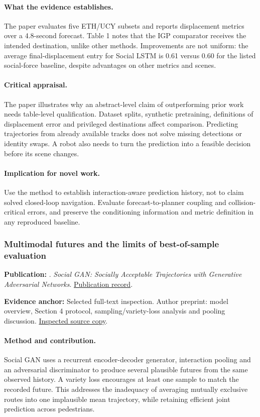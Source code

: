 \paragraph{What the evidence establishes.} The paper evaluates five ETH/UCY subsets and reports displacement metrics over a 4.8-second forecast. Table 1 notes that the IGP comparator receives the intended destination, unlike other methods. Improvements are not uniform: the average final-displacement entry for Social LSTM is 0.61 versus 0.60 for the listed social-force baseline, despite advantages on other metrics and scenes.

\paragraph{Critical appraisal.} The paper illustrates why an abstract-level claim of outperforming prior work needs table-level qualification. Dataset splits, synthetic pretraining, definitions of displacement error and privileged destinations affect comparison. Predicting trajectories from already available tracks does not solve missing detections or identity swaps. A robot also needs to turn the prediction into a feasible decision before its scene changes.

\paragraph{Implication for novel work.} Use the method to establish interaction-aware prediction history, not to claim solved closed-loop navigation. Evaluate forecast-to-planner coupling and collision-critical errors, and preserve the conditioning information and metric definition in any reproduced baseline.

\subsubsection{Multimodal futures and the limits of best-of-sample evaluation}\label{paper:socialgan}
\textbf{Publication:} \citet{socialgan}. \emph{Social GAN: Socially Acceptable Trajectories with Generative Adversarial Networks}. \href{https://doi.org/10.1109/cvpr.2018.00240}{Publication record}.

\textbf{Evidence anchor:} Selected full-text inspection. Author preprint: model overview, Section 4 protocol, sampling/variety-loss analysis and pooling discussion. \href{https://arxiv.org/pdf/1803.10892}{Inspected source copy}.

\paragraph{Method and contribution.} Social GAN uses a recurrent encoder-decoder generator, interaction pooling and an adversarial discriminator to produce several plausible futures from the same observed history. A variety loss encourages at least one sample to match the recorded future. This addresses the inadequacy of averaging mutually exclusive routes into one implausible mean trajectory, while retaining efficient joint prediction across pedestrians.

